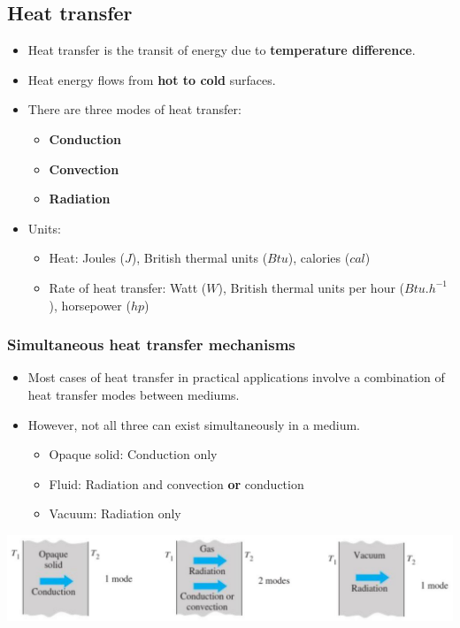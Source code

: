 \documentclass[11pt]{article}
\begin{document}
\subsection{Heat transfer}
\label{sec:org57cceae}
\begin{itemize}
\item Heat transfer is the transit of energy due to \textbf{temperature difference}.
\item Heat energy flows from \textbf{hot to cold} surfaces.
\item There are three modes of heat transfer:
\begin{itemize}
\item \textbf{Conduction}
\item \textbf{Convection}
\item \textbf{Radiation}
\end{itemize}
\item Units:
\begin{itemize}
\item Heat: Joules (\(\unit{J}\)), British thermal units (\(\unit{Btu}\)), calories (\(\unit{cal}\))
\item Rate of heat transfer: Watt (\(\unit{W}\)), British thermal units per hour (\(\unit{Btu.h^{-1}}\)), horsepower (\(\unit{hp}\))
\end{itemize}
\end{itemize}
\subsubsection{Simultaneous heat transfer mechanisms}
\label{sec:orgd1ebd78}
\begin{itemize}
\item Most cases of heat transfer in practical applications involve a combination of heat transfer modes between mediums.
\item However, not all three can exist simultaneously in a medium.
\begin{itemize}
\item Opaque solid: Conduction only
\item Fluid: Radiation and convection \textbf{or} conduction
\item Vacuum: Radiation only
\end{itemize}
\end{itemize}

\begin{center}
\includegraphics[width=.9\linewidth]{./images/simultaneous-heat-transfer-mechanisms.png}
\end{center}
\end{document}
